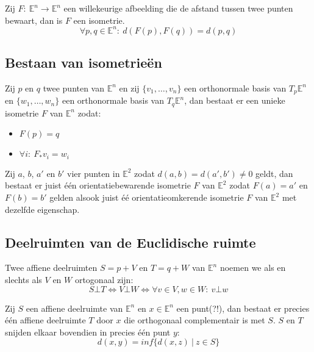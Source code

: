\documentclass[main.tex]{subfiles}
\begin{document}
\begin{st}
  Zij $F:\ \mathbb{E}^{n}\rightarrow \mathbb{E}^{n}$ een willekeurige afbeelding die de afstand tussen twee punten bewaart, dan is $F$ een isometrie.
  \[ \forall p,q \in \mathbb{E}^{n}:\  d(F(p),F(q)) = d(p,q) \]
\end{st}

\subsection{Bestaan van isometrie\"en}
\label{sec:best-van-isom}

\begin{st}
  Zij $p$ en $q$ twee punten van $\mathbb{E}^{n}$ en zij $\{ v_{1},\dotsc,v_{n} \}$ een orthonormale basis van $T_{p}\mathbb{E}^{n}$ en $\{ w_{1},\dotsc,w_{n} \}$ een orthonormale basis van $T_{q}\mathbb{E}^{n}$, dan bestaat er een unieke isometrie $F$ van $\mathbb{E}^{n}$ zodat:
  \begin{itemize}
  \item $F(p) = q$
  \item $\forall i:\ F_{*}v_{i} = w_{i}$
  \end{itemize}
\end{st}

\begin{gev}
  Zij $a$, $b$, $a'$ en $b'$ vier punten in $\mathbb{E}^{2}$ zodat $d(a,b) = d(a',b') \neq 0$ geldt, dan bestaat er juist \'e\'en orientatiebewarende isometrie $F$ van $\mathbb{E}^{2}$ zodat $F(a) = a'$ en $F(b) = b'$ gelden alsook juist \'e\'e orientatieomkerende isometrie $F$ van $\mathbb{E}^{2}$ met dezelfde eigenschap.
\end{gev}

\subsection{Deelruimten van de Euclidische ruimte}
\label{sec:deelruimten-van-de}

\begin{de}
  Twee affiene deelruimten $S=p+V$ en $T=q+W$ van $\mathbb{E}^{n}$ noemen we  als en slechts als $V$ en $W$ ortogonaal zijn:
  \[ S \bot T \Leftrightarrow V \bot W \Leftrightarrow \forall v \in V, w \in W:\ v \bot w \]
\end{de}

\begin{st}
  Zij $S$ een affiene deelruimte van $\mathbb{E}^{n}$ en $x\in \mathbb{E}^{n}$ een punt(?!), dan bestaat er precies \'e\'en affiene deelruimte $T$ door $x$ die orthogonaal complementair is met $S$.
  $S$ en $T$ snijden elkaar bovendien in precies \'e\'en punt $y$:
  \[ d(x,y) = inf\{ d(x,z) \ |\ z \in S  \} \]
\end{st}
\end{document}

